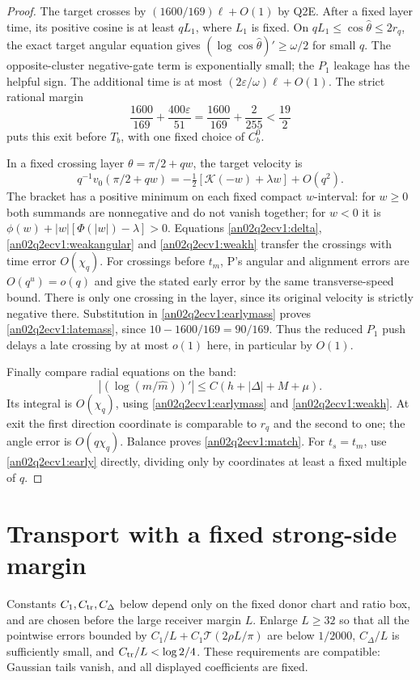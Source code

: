 \documentclass[11pt]{article}
\theoremstyle{remark}\newtheorem{remark}[theorem]{Remark}
\newcommand{\eps}{\varepsilon}
\newcommand{\Kfun}{\mathcal K}
\begin{document}
\begin{proof}
The target crosses by $(1600/169)\ell+O(1)$ by Q2E.
After a fixed layer time, its positive cosine is at least $qL_1$,
where $L_1$ is fixed. On $qL_1\le\cos\widehat\theta\le2r_q$,
the exact target angular equation gives
$(\log\cos\widehat\theta)'\ge\omega/2$ for small $q$.
The opposite-cluster negative-gate term is exponentially small;
the $P_1$ leakage has the helpful sign.
The additional time is at most $(2\eps/\omega)\ell+O(1)$.
The strict rational margin
\[
 \frac{1600}{169}+\frac{400\eps}{51}
 =\frac{1600}{169}+\frac2{255}<\frac{19}{2}
\]
puts this exit before $T_b$, with one fixed choice of $C_b^0$.

In a fixed crossing layer $\theta=\pi/2+qw$, the target velocity is
\[
 q^{-1}v_0(\pi/2+qw)
 =-\tfrac12[\Kfun(-w)+\lambda w]+O(q^2).
\]
The bracket has a positive minimum on each fixed compact $w$-interval:
for $w\ge0$ both summands are nonnegative and do not vanish together;
for $w<0$ it is $\phi(w)+|w|[\Phi(|w|)-\lambda]>0$.
Equations \eqref{an02q2ecv1:delta}, \eqref{an02q2ecv1:weakangular}
and \eqref{an02q2ecv1:weakh} transfer the crossings with time error
$O(\chi_q)$. For crossings before $t_m$, P's angular and alignment
errors are $O(q^u)=o(q)$ and give the stated early error by the
same transverse-speed bound. There is only one crossing in the
layer, since its original velocity is strictly negative there.
Substitution in \eqref{an02q2ecv1:earlymass} proves
\eqref{an02q2ecv1:latemass}, since $10-1600/169=90/169$.
Thus the reduced $P_1$ push delays a late crossing by at most
$o(1)$ here, in particular by $O(1)$.

Finally compare radial equations on the band:
\[
 \left|(\log(m/\widehat m))'\right|
       \le C(h+|\Delta|+M+\mu).
\]
Its integral is $O(\chi_q)$, using \eqref{an02q2ecv1:earlymass}
and \eqref{an02q2ecv1:weakh}. At exit the first direction
coordinate is comparable to $r_q$ and the second to one;
the angle error is $O(q\chi_q)$. Balance proves
\eqref{an02q2ecv1:match}. For $t_s=t_m$, use
\eqref{an02q2ecv1:early} directly, dividing only by coordinates
at least a fixed multiple of $q$.
\end{proof}

\section{Transport with a fixed strong-side margin}
Constants $C_1,C_{\rm tr},C_\Delta$ below depend only on the
fixed donor chart and ratio box, and are chosen before the
large receiver margin $L$. Enlarge $L\ge32$ so that all the
pointwise errors bounded by $C_1/L+C_1\mathcal T(2\rho L/\pi)$
are below $1/2000$, $C_\Delta/L$ is sufficiently small, and
$C_{\rm tr}/L<\log2/4$. These requirements are compatible:
Gaussian tails vanish, and all displayed coefficients are fixed.
\end{document}

